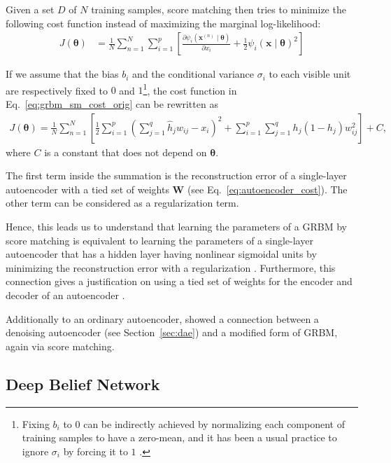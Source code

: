 \documentclass[dissertation,nocontribution]{aaltoseries}
\newcommand{\vect}[1]{\mathbf{#1}}
\newcommand{\vects}[1]{\boldsymbol{#1}}
\newcommand{\matr}[1]{\mathbf{#1}}
\newcommand{\vx}[0]{\vect{x}}
\newcommand{\mW}[0]{\matr{W}}
\newcommand{\TT}[0]{{\vects{\theta}}}
\begin{document}
Given a set $D$ of $N$ training samples, score matching
then tries to minimize the following cost function
instead of maximizing the marginal log-likelihood:
\begin{align}
    \label{eq:grbm_sm_cost_orig}
    J(\TT) &= \frac{1}{N} \sum_{n=1}^N \sum_{i=1}^p \left[
    \frac{\partial \psi_i(\vx^{(n)} \mid \TT)}{\partial x_i}
    + \frac{1}{2} \psi_i (\vx \mid \TT)^2
    \right]
\end{align}

If we assume that the bias $b_i$ and the conditional
variance $\sigma_i$ to each visible unit are respectively
fixed to $0$ and $1$\footnote{ Fixing $b_i$ to $0$ can be
indirectly achieved by normalizing each component of
training samples to have a zero-mean, and it has been a
usual practice to ignore $\sigma_i$ by forcing it to $1$
\citep[see, e.g.,][]{Hinton2012rbm}.  }, the cost function in
Eq.~\eqref{eq:grbm_sm_cost_orig} can be rewritten as
\begin{align*}
    J(\TT) = \frac{1}{N} \sum_{n=1}^N \left[ \frac{1}{2}
    \sum_{i=1}^p \left( \sum_{j=1}^q \hat{h}_j w_{ij} - x_i
    \right)^2 + \sum_{i=1}^p \sum_{j=1}^q h_j(1 - h_j)
    w_{ij}^2 \right] + C,
\end{align*}
where $C$ is a constant that does not depend on $\TT$.

The first term inside the summation
is the reconstruction error of a single-layer autoencoder
with a tied set of weights $\mW$ (see
Eq.~\eqref{eq:autoencoder_cost}). The other term can be
considered as a regularization term.

Hence, this leads us to understand that learning the
parameters of a GRBM by score matching is equivalent to
learning the parameters of a single-layer autoencoder that
has a hidden layer having nonlinear sigmoidal units by
minimizing the reconstruction error with a regularization
\citep{Swersky2011}. Furthermore, this connection gives a
justification on using a tied set of weights for the
encoder and decoder of an autoencoder \citep{Vincent2011}.

Additionally to an ordinary autoencoder, \citet{Vincent2011}
showed a connection between a denoising autoencoder (see
Section~\ref{sec:dae}) and a modified form of GRBM, again
via score matching. 


\clearpage
\subsection{Deep Belief Network}
\label{sec:dbn}
\end{document}
